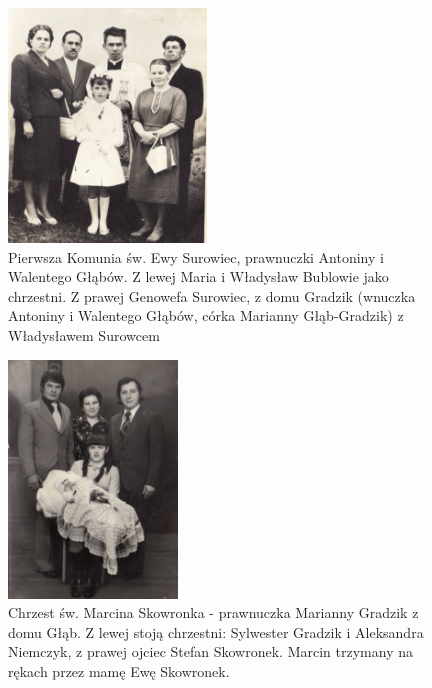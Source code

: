 \begin{figure}[!h]
\begin{center}
\includegraphics[width=0.47\textwidth]{zdjecia/ewa_skowronek_genowefa_i_wladyslaw_surowiec.jpg}
\caption[Pierwsza Komunia św. Ewy Surowiec]{Pierwsza Komunia św. Ewy Surowiec, prawnuczki Antoniny i Walentego Głąbów. Z lewej Maria i Władysław Bublowie jako chrzestni. Z prawej Genowefa Surowiec, z domu Gradzik (wnuczka Antoniny i Walentego Głąbów, córka Marianny Głąb-Gradzik) z Władysławem Surowcem}
\label{rys:ewa_skowronek_genowefa_i_wladyslaw_surowiec}
\end{center}
\end{figure}

\begin{figure}[!ht]
\begin{center}
\includegraphics[width=0.4\textwidth]{zdjecia/marcin_skowronek_chrzest.jpg}
\caption[Chrzest św. Marcina Skowronka]{Chrzest św. Marcina Skowronka - prawnuczka Marianny Gradzik z domu Głąb. Z lewej stoją chrzestni: Sylwester Gradzik i Aleksandra Niemczyk, z prawej ojciec Stefan Skowronek. Marcin trzymany na rękach przez mamę Ewę Skowronek.}
\label{rys:marcin_skowronek_chrzest}
\end{center}
\end{figure}

